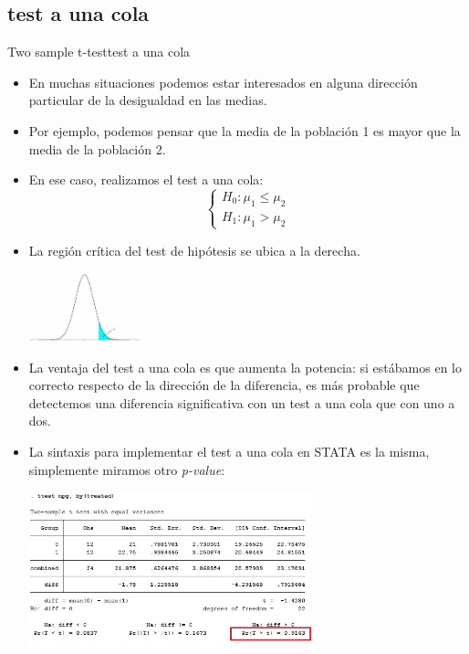 \documentclass{beamer}
\begin{document}
\subsection{test a una cola}
\begin{frame}[allowframebreaks]{Two sample t-test}{test a una cola}
\begin{itemize}
\item En muchas situaciones podemos estar interesados en alguna dirección particular de la desigualdad en las medias. 
\item Por ejemplo, podemos pensar que la media de la población 1 es mayor que la media de la población 2.
\item En ese caso, realizamos el test a una cola:\\
\begin{displaymath}
\left\{ \begin{array}{l}
H_{0}: \mu_{1} \leq \mu_{2} \\ 
H_{1}: \mu_{1} > \mu_{2} 
\end{array} \right.
\end{displaymath}
\item La región crítica del test de hipótesis se ubica a la derecha.\\\smallskip
\begin{center}
\includegraphics[height=2cm]{ttest3.jpg}
\end{center}
\item La ventaja del test a una cola es que aumenta la potencia: si estábamos en lo correcto respecto de la dirección de la diferencia, es más probable que detectemos una diferencia significativa con un test a una cola que con uno a dos.
\item La sintaxis para implementar el test a una cola en STATA es la misma, simplemente miramos otro \textit{p-value}:\\
\begin{center}
\includegraphics[height=4.5cm]{ttest4.jpg}
\end{center}
\end{itemize}
\end{frame}
\end{document}
